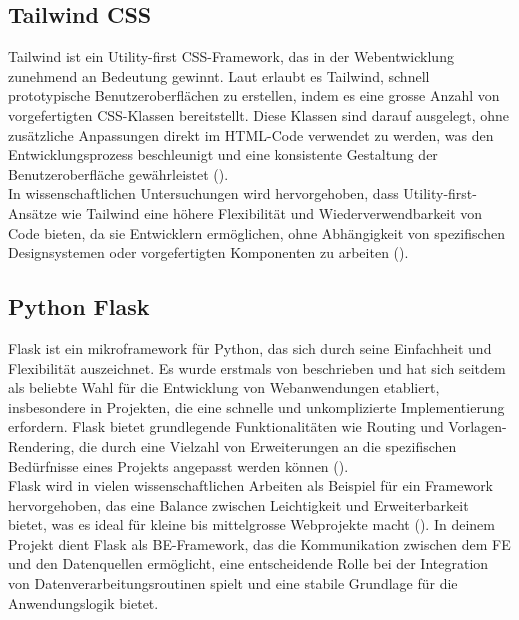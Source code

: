 \documentclass[a4paper, 12pt]{scrartcl}
\begin{document}
\subsection{Tailwind CSS}
\ac{Tailwind} ist ein Utility-first CSS-Framework, das in der Webentwicklung zunehmend an Bedeutung gewinnt. Laut \textcite{Rifandi2022} erlaubt es \ac{Tailwind}, schnell prototypische Benutzeroberflächen zu erstellen, indem es eine grosse Anzahl von vorgefertigten CSS-Klassen bereitstellt. Diese Klassen sind darauf ausgelegt, ohne zusätzliche Anpassungen direkt im HTML-Code verwendet zu werden, was den Entwicklungsprozess beschleunigt und eine konsistente Gestaltung der Benutzeroberfläche gewährleistet (\cite{Rifandi2022}).\\[1em] In wissenschaftlichen Untersuchungen wird hervorgehoben, dass Utility-first-Ansätze wie \ac{Tailwind} eine höhere Flexibilität und Wiederverwendbarkeit von Code bieten, da sie Entwicklern ermöglichen, ohne Abhängigkeit von spezifischen Designsystemen oder vorgefertigten Komponenten zu arbeiten (\cite{Wang2023}).

\subsection{Python Flask}
Flask ist ein mikroframework für Python, das sich durch seine Einfachheit und Flexibilität auszeichnet. Es wurde erstmals von \textcite{Relan2019} beschrieben und hat sich seitdem als beliebte Wahl für die Entwicklung von Webanwendungen etabliert, insbesondere in Projekten, die eine schnelle und unkomplizierte Implementierung erfordern. Flask bietet grundlegende Funktionalitäten wie Routing und Vorlagen-Rendering, die durch eine Vielzahl von Erweiterungen an die spezifischen Bedürfnisse eines Projekts angepasst werden können (\cite{Chauhan2019}).\\[1em]Flask wird in vielen wissenschaftlichen Arbeiten als Beispiel für ein Framework hervorgehoben, das eine Balance zwischen Leichtigkeit und Erweiterbarkeit bietet, was es ideal für kleine bis mittelgrosse Webprojekte macht (\cite{PAZDRIY2023}). In deinem Projekt dient Flask als \ac{BE}-Framework, das die Kommunikation zwischen dem \ac{FE} und den Datenquellen ermöglicht, eine entscheidende Rolle bei der Integration von Datenverarbeitungsroutinen spielt und eine stabile Grundlage für die Anwendungslogik bietet.
\clearpage
\end{document}
